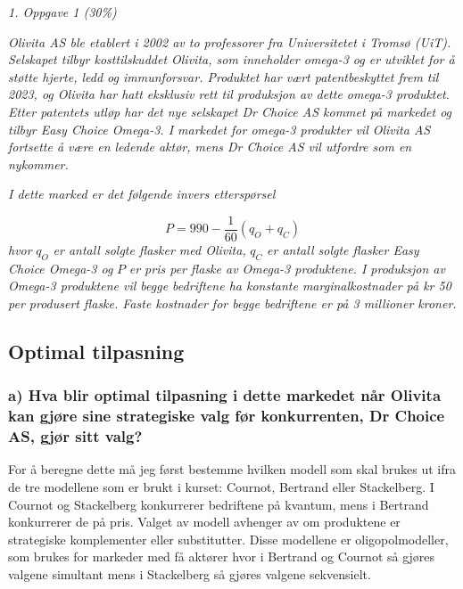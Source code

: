 \documentclass[
  12pt,
  a4paper,
  DIV=11,
  numbers=noendperiod]{scrartcl}
\begin{document}
\begin{center}
    \Large
    \textit{1.  Oppgave 1 (30\%)}
\end{center}

\textit{Olivita AS ble etablert i 2002 av to professorer fra Universitetet i Tromsø (UiT). Selskapet tilbyr kosttilskuddet Olivita, som inneholder omega-3 og er utviklet for å støtte hjerte, ledd og immunforsvar. Produktet har vært patentbeskyttet frem til 2023, og Olivita har hatt eksklusiv rett til produksjon av dette omega-3 produktet. Etter patentets utløp har det nye selskapet Dr Choice AS kommet på markedet og tilbyr Easy Choice Omega-3. I markedet for omega-3 produkter vil Olivita AS fortsette å være en ledende aktør, mens Dr Choice AS vil utfordre som en nykommer.}

\textit{I dette marked er det følgende invers etterspørsel}

$$
P = 990 - \frac{1}{60}(q_O + q_C)
$$ 
\textit{hvor} $q_O$ \textit{er antall solgte flasker med Olivita,} $q_C$ \textit{er antall solgte flasker Easy Choice Omega-3 og} $P$ \textit{er pris per flaske av Omega-3 produktene. I produksjon av Omega-3 produktene vil begge bedriftene ha konstante marginalkostnader på kr 50 per produsert flaske. Faste kostnader for begge bedriftene er på 3 millioner kroner.}

\subsection{Optimal tilpasning}\label{optimal-tilpasning}

\subsubsection{a) Hva blir optimal tilpasning i dette markedet når Olivita kan gjøre sine strategiske valg før konkurrenten, Dr Choice AS, gjør sitt valg?}\label{a-hva-blir-optimal-tilpasning-i-dette-markedet-nuxe5r-olivita-kan-gjuxf8re-sine-strategiske-valg-fuxf8r}

For å beregne dette må jeg først bestemme hvilken modell som skal brukes
ut ifra de tre modellene som er brukt i kurset: Cournot, Bertrand eller
Stackelberg. I Cournot og Stackelberg konkurrerer bedriftene på kvantum,
mens i Bertrand konkurrerer de på pris. Valget av modell avhenger av om
produktene er strategiske komplementer eller substitutter. Disse
modellene er oligopolmodeller, som brukes for markeder med få aktører
hvor i Bertrand og Cournot så gjøres valgene simultant mens i
Stackelberg så gjøres valgene sekvensielt.
\end{document}
